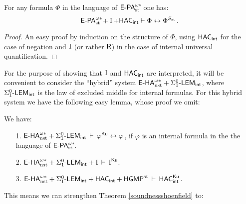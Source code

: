 \begin{prop}
For any formula $\Phi$ in the language of $\epaststar$ one has:
\[ \epaststar + \I + \HAC_\intern \vdash \Phi \leftrightarrow \Phi^\Sh. \]
\end{prop}
\begin{proof}
An easy proof by induction on the structure of $\Phi$, using $\HAC_\intern$ for the case of negation and $\I$ (or rather $\R$) in the case of internal universal quantification.
\end{proof}

For the purpose of showing that $\I$ and $\HAC_\intern$ are interpreted, it will be convenient to consider the ``hybrid'' system $\ehanststar + \LEM_\intern$, where $\LEM_\intern$ is the law of excluded middle for internal formulas. For this hybrid system we have the following easy lemma, whose proof we omit:

\begin{lemma} We have:
\begin{enumerate}
\item[1.] $\ehanststar + \LEM_\intern \, \vdash \, \varphi^\ku \leftrightarrow \varphi$, if $\varphi$ is an internal formula in the the language of $\epaststar$.
\item[2.] $\ehanststar + \LEM_\intern + \I \, \vdash \, \I^\ku$.
\item[3.] $\ehanststar + \LEM_\intern + \HAC_\intern + \HGMP \, \vdash \, \HAC^\ku_\intern$.
\end{enumerate}
\end{lemma}

This means we can strengthen Theorem  \ref{soundnessshoenfield} to:

